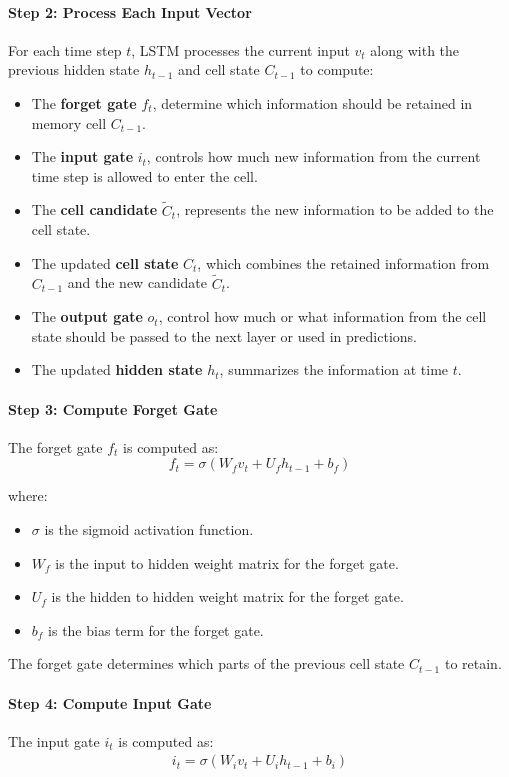 \documentclass[12pt,a4paper]{article}
\begin{document}
\paragraph{Step 2: Process Each Input Vector}
For each time step $t$, LSTM processes the current input $v_t$ along with the previous hidden state $h_{t-1}$ and cell state $C_{t-1}$ to compute:
\begin{itemize}
    \item The \textbf{forget gate} $f_t$, determine which information should be retained in memory cell $C_{t-1}$.
    \item The \textbf{input gate} $i_t$, controls how much new information from the current time step is allowed to enter the cell.
    \item The \textbf{cell candidate} $\tilde{C}_t$, represents the new information to be added to the cell state.
    \item The updated \textbf{cell state} $C_t$, which combines the retained information from $C_{t-1}$ and the new candidate $\tilde{C}_t$.
    \item The \textbf{output gate} $o_t$, control how much or what information from the cell state should be passed to the next layer or used in predictions.
    \item The updated \textbf{hidden state} $h_t$, summarizes the information at time $t$.
\end{itemize}

\paragraph{Step 3: Compute Forget Gate}
The forget gate $f_t$ is computed as:
\begin{equation}
    f_t = \sigma(W_f v_t + U_f h_{t-1} + b_f)
\end{equation}

where:
\begin{itemize}
    \item $\sigma$ is the sigmoid activation function.
    \item $W_f$ is the input to hidden weight matrix for the forget gate.
    \item $U_f$ is the hidden to hidden weight matrix for the forget gate.
    \item $b_f$ is the bias term for the forget gate.
\end{itemize}
The forget gate determines which parts of the previous cell state $C_{t-1}$ to retain.

\paragraph{Step 4: Compute Input Gate}
The input gate $i_t$ is computed as:
\begin{eqnarray}
    i_t = \sigma(W_i v_t + U_i h_{t-1} + b_i)
\end{eqnarray}
\end{document}
